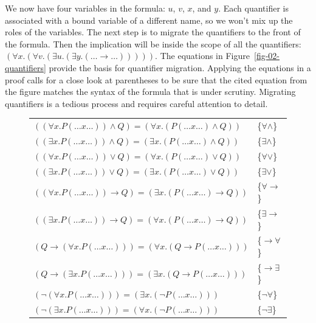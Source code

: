 {{We now have four variables in the formula: $u$, $v$, $x$, and $y$.
Each quantifier is associated with a bound variable of a different name,
so we won't mix up the roles of the variables.
The next step is to migrate the quantifiers to the front of the formula.
Then the implication will be inside the scope of all the quantifiers:
$(\forall x.(\forall v.(\exists u.(\exists y.(\dots\rightarrow\dots)))))$.
The equations in Figure~\ref{fig-02-quantifiers}
provide the basis for quantifier migration.
Applying the equations in a proof calls for a close look
at parentheses to be sure that the cited equation from
the figure matches the syntax of the formula that is under scrutiny.
Migrating quantifiers is a tedious process and requires
careful attention to detail.

\begin{figure}
\begin{center}
\begin{tabular}{ll}
$((\forall x.P(\dots x \dots)) \wedge Q) = (\forall x.(P(\dots x \dots) \wedge Q))$               & \{$\forall\wedge$\} \\
$((\exists x.P(\dots x \dots)) \wedge Q) = (\exists x.(P(\dots x \dots) \wedge Q))$               & \{$\exists\wedge$\} \\
$((\forall x.P(\dots x \dots)) \vee Q) = (\forall x.(P(\dots x \dots) \vee Q))$                   & \{$\forall\vee$\} \\
$((\exists x.P(\dots x \dots)) \vee Q) = (\exists x.(P(\dots x \dots) \vee Q))$                   & \{$\exists\vee$\} \\
$((\forall x.P(\dots x \dots)) \rightarrow Q) = (\exists x.(P(\dots x \dots) \rightarrow Q))$     & \{${\forall}{\rightarrow}$\} \\
$((\exists x.P(\dots x \dots)) \rightarrow Q) = (\forall x.(P(\dots x \dots) \rightarrow Q))$     & \{${\exists}{\rightarrow}$\} \\
$(Q \rightarrow (\forall x.P(\dots x \dots))) = (\forall x.(Q \rightarrow P(\dots x \dots)))$     & \{${\rightarrow}{\forall}$\} \\
$(Q \rightarrow (\exists x.P(\dots x \dots))) = (\exists x.(Q \rightarrow P(\dots x \dots)))$     & \{${\rightarrow}{\exists}$\} \\
$(\neg (\forall x.P(\dots x \dots))) = (\exists x.(\neg P(\dots x \dots)))$                       & \{$\neg\forall$\} \\
$(\neg (\exists x.P(\dots x \dots))) = (\forall x.(\neg P(\dots x \dots)))$                       & \{$\neg\exists$\} \\

\end{tabular}
\end{center}
\end{figure}}}
